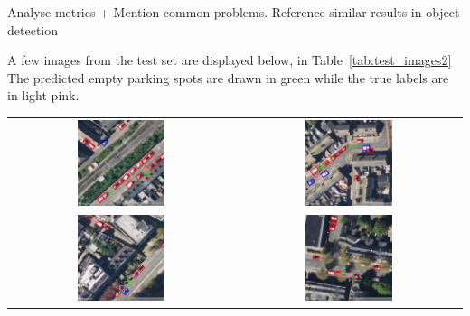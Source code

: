 Analyse metrics + Mention common problems. Reference similar results in object detection

A few images from the test set are displayed below, in Table~\ref{tab:test_images2}
The predicted empty parking spots are drawn in green while the true labels are in light pink.

\begin{table}[h]
    \centering
    \begin{tabular}{cc}
        \includegraphics[width=0.4\textwidth]{images/image1_empty_parking_detection_test_set.png} & \includegraphics[width=0.4\textwidth]{images/image2_empty_parking_detection_test_set.png} \\
        \includegraphics[width=0.4\textwidth]{images/image3_empty_parking_detection_test_set.png} & \includegraphics[width=0.4\textwidth]{images/image4_empty_parking_detection_test_set.png} \\

\end{tabular}
\end{table}
